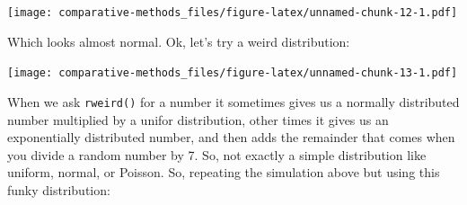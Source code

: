 \documentclass[]{article}
\newenvironment{Shaded}{\begin{snugshade}}{\end{snugshade}}
\newcommand{\ControlFlowTok}[1]{\textcolor[rgb]{0.13,0.29,0.53}{\textbf{#1}}}
\newcommand{\DataTypeTok}[1]{\textcolor[rgb]{0.13,0.29,0.53}{#1}}
\newcommand{\DecValTok}[1]{\textcolor[rgb]{0.00,0.00,0.81}{#1}}
\newcommand{\FloatTok}[1]{\textcolor[rgb]{0.00,0.00,0.81}{#1}}
\newcommand{\KeywordTok}[1]{\textcolor[rgb]{0.13,0.29,0.53}{\textbf{#1}}}
\newcommand{\NormalTok}[1]{#1}
\newcommand{\OperatorTok}[1]{\textcolor[rgb]{0.81,0.36,0.00}{\textbf{#1}}}
\newcommand{\StringTok}[1]{\textcolor[rgb]{0.31,0.60,0.02}{#1}}
\theoremstyle{definition}
\theoremstyle{definition}
\theoremstyle{definition}
\theoremstyle{remark}
\begin{document}
\texttt{[image: comparative-methods\_files/figure-latex/unnamed-chunk-12-1.pdf]}

Which looks almost normal. Ok, let's try a weird distribution:

\begin{Shaded}
\end{Shaded}

\texttt{[image: comparative-methods\_files/figure-latex/unnamed-chunk-13-1.pdf]}

When we ask \texttt{rweird()} for a number it sometimes gives us a
normally distributed number multiplied by a unifor distribution, other
times it gives us an exponentially distributed number, and then adds the
remainder that comes when you divide a random number by 7. So, not
exactly a simple distribution like uniform, normal, or Poisson. So,
repeating the simulation above but using this funky distribution:
\end{document}
